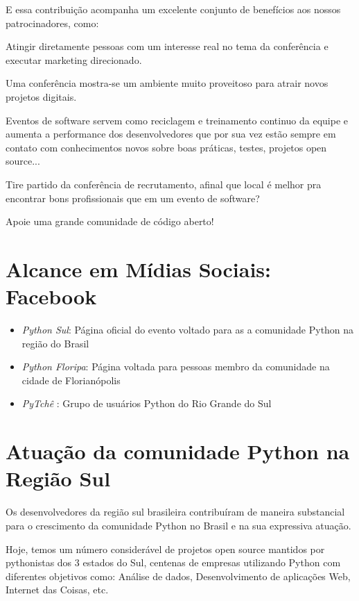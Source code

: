 \documentclass[12pt]{article}
\begin{document}
E essa contribuição acompanha um excelente conjunto de benefícios aos nossos patrocinadores, como:
\begin{description}[align=right,labelwidth=4cm]
    \item [Visibilidade:] Atingir diretamente pessoas com um interesse real no tema da conferência e executar marketing direcionado.
    \item [Oportunidades:] Uma conferência mostra-se um ambiente muito proveitoso para atrair novos projetos digitais.
    \item [Produtividade:] Eventos de software servem como reciclagem e treinamento continuo da equipe e aumenta a performance dos desenvolvedores que por sua vez estão sempre em contato com conhecimentos novos sobre boas práticas, testes, projetos open source...
    \item [Contratação:] Tire partido da conferência de recrutamento, afinal que local é melhor pra encontrar bons profissionais que em um evento de software?
    \item [Patrocínio:] Apoie uma grande comunidade de código aberto!
\end{description}

\section{Alcance em Mídias Sociais: Facebook}
\begin{itemize}[label={}]
    \item \emph{Python Sul}: Página oficial do evento voltado para as a comunidade Python na região do Brasil
    \item \emph{Python Floripa}: Página voltada para pessoas membro da comunidade na cidade de Florianópolis
    \item \emph{PyTchê }: Grupo de usuários Python do Rio Grande do Sul
\end{itemize}

\section{Atuação da comunidade Python na Região Sul}

Os desenvolvedores da região sul brasileira contribuíram de maneira substancial para o crescimento da comunidade Python no Brasil e na sua expressiva atuação.

Hoje, temos um número considerável de projetos open source mantidos por pythonistas dos 3 estados do Sul, centenas de empresas utilizando Python com diferentes objetivos como: Análise de dados, Desenvolvimento de aplicações Web, Internet das Coisas, etc.
\end{document}
